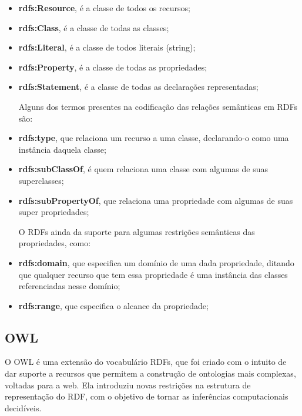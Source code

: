 \begin{itemize}
    \item \textbf{rdfs:Resource}, é a classe de todos os recursos;
    
    \item \textbf{rdfs:Class}, é a classe de todas as classes;
    
    \item \textbf{rdfs:Literal}, é a classe de todos literais (string);
    
    \item \textbf{rdfs:Property}, é a classe de todas as propriedades;
    
    \item \textbf{rdfs:Statement}, é a classe de todas as declarações 
    representadas;
    
    Alguns dos termos presentes na codificação das relações semânticas em RDFs 
    são:
    
    \item \textbf{rdfs:type}, que relaciona um recurso a uma classe, declarando-o
    como uma instância daquela classe;
    
    \item \textbf{rdfs:subClassOf}, é quem relaciona uma classe com algumas de 
    suas superclasses;
    
    \item \textbf{rdfs:subPropertyOf}, que relaciona uma propriedade com algumas
    de suas super propriedades;
    
    O RDFs ainda da suporte para algumas restrições semânticas das propriedades,
    como:
    
    \item \textbf{rdfs:domain}, que especifica um domínio de uma dada propriedade,
    ditando que qualquer recurso que tem essa propriedade é uma instância das 
    classes referenciadas nesse domínio;
    
    \item \textbf{rdfs:range}, que especifica o alcance da propriedade;
\end{itemize}


\subsection{OWL}
\label{sec:owl}

O OWL é uma extensão do vocabulário RDFs, que foi criado com o intuito de dar 
suporte a recursos que permitem a construção de ontologias mais complexas, voltadas
para a web. Ela introduziu novas restrições na estrutura de representação do RDF,
com o objetivo de tornar as inferências computacionais decidíveis.

